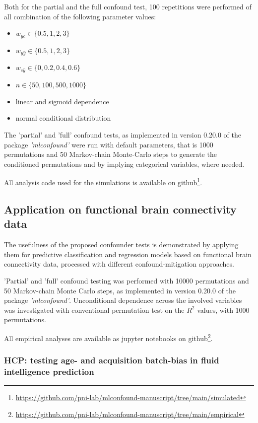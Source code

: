 \documentclass{article}
\begin{document}
Both for the partial and the full confound test, 100 repetitions were performed of all combination of the following parameter values: 
\begin{itemize}
    \item $w_{yc} \in \{0.5, 1, 2, 3\}$
    \item $w_{y\hat{y}} \in \{0.5, 1, 2, 3\}$
    \item $w_{c\hat{y}} \in \{0, 0.2, 0.4, 0.6\}$
    \item $n \in \{50, 100, 500, 1000\}$
    \item linear and sigmoid dependence
    \item normal conditional distribution
\end{itemize}

The 'partial' and 'full' confound tests, as implemented in version 0.20.0 of the package \emph{'mlconfound'} were run with default parameters, that is 1000 permutations and 50 Markov-chain Monte-Carlo steps to generate the conditioned permutations and by implying categorical variables, where needed.

All analysis code used for the simulations is available on github\footnote{\href{https://github.com/pni-lab/mlconfound-manuscript/tree/main/simulated}{https://github.com/pni-lab/mlconfound-manuscript/tree/main/simulated}}.

\subsection{Application on functional brain connectivity data}

The usefulness of the proposed confounder tests is demonstrated by applying them for predictive classification and regression models based on functional brain connectivity data, processed with different confound-mitigation approaches. 

'Partial' and 'full' confound testing was performed with 10000 permutations and 50 Markov-chain Monte Carlo steps, as implemented in version 0.20.0 of the package \emph{'mlconfound'}. Unconditional dependence across the involved variables was investigated with conventional permutation test on the $R^2$ values, with 1000 permutations. 

All empirical analyses are available as jupyter notebooks on github\footnote{\href{https://github.com/pni-lab/mlconfound-manuscript/tree/main/empirical}{https://github.com/pni-lab/mlconfound-manuscript/tree/main/empirical}}.

\subsubsection*{HCP: testing age- and acquisition batch-bias in fluid intelligence prediction}
\end{document}
